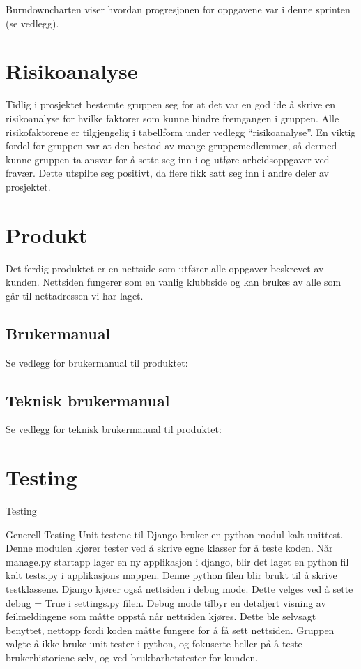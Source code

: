 \documentclass[12pt,a4paper,norsk]{article}
\begin{document}
Burndowncharten viser hvordan progresjonen for oppgavene var i denne sprinten (se vedlegg).

	
	\section{Risikoanalyse}
	Tidlig i prosjektet bestemte gruppen seg for at det var en god ide å skrive en risikoanalyse for hvilke faktorer som kunne hindre fremgangen i gruppen. Alle risikofaktorene er tilgjengelig i tabellform under vedlegg “risikoanalyse”. En viktig fordel for gruppen var at den bestod av mange gruppemedlemmer, så dermed kunne gruppen ta ansvar for å sette seg inn i og utføre arbeidsoppgaver ved fravær. Dette utspilte seg positivt, da flere fikk satt seg inn i andre deler av prosjektet.
	\section{Produkt}
	Det ferdig produktet er en nettside som utfører alle oppgaver beskrevet av kunden. Nettsiden fungerer som en vanlig klubbside og kan brukes av alle som går til nettadressen vi har laget.
	\subsection{Brukermanual}
	Se vedlegg for brukermanual til produktet:
	\subsection{Teknisk brukermanual}
	Se vedlegg for teknisk brukermanual til produktet: 
	
	\section{Testing}
	Testing

Generell Testing
Unit testene til Django bruker en python modul kalt unittest. Denne modulen kjører tester ved å skrive egne klasser for å teste koden. Når manage.py startapp lager en ny applikasjon i django, blir det laget en python fil kalt tests.py i applikasjons mappen. Denne python filen blir brukt til å skrive testklassene. Django kjører også nettsiden i debug mode. Dette velges ved å sette debug = True i settings.py filen. Debug mode tilbyr en detaljert visning av feilmeldingene som måtte oppstå når nettsiden kjøres. Dette ble selvsagt benyttet, nettopp fordi koden måtte fungere for å få sett nettsiden. Gruppen valgte å ikke bruke unit tester i python, og fokuserte heller på å teste brukerhistoriene selv, og ved brukbarhetstester for kunden.
\end{document}
